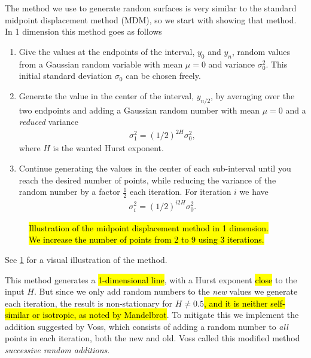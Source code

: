 The method we use to generate random surfaces is very similar to the standard midpoint displacement method (MDM), so we start with showing that method. In 1 dimension this method goes as follows
%
\begin{enumerate}
    \item Give the values at the endpoints of the interval, $y_0$ and $y_n$, random values from a Gaussian random variable with mean $\mu = 0$ and variance $\sigma_0^2$. This initial standard deviation $\sigma_0$ can be chosen freely.
    \item Generate the value in the center of the interval, $y_{n/2}$, by averaging over the two endpoints and adding a Gaussian random number with mean $\mu = 0$ and a \emph{reduced} variance
    \begin{align}
         \sigma_1^2 = \left(1/2\right)^{2H}\sigma_0^2, \label{eq:midpoint_sigma_first}
    \end{align}
    where $H$ is the wanted Hurst exponent.
    \item Continue generating the values in the center of each sub-interval until you reach the desired number of points, while reducing the variance of the random number by a factor $\frac{1}{2}$ each iteration. For iteration $i$ we have
    \begin{align}
        \sigma_i^2 = \left(1/2\right)^{i2H}\sigma_0^2. \label{eq:midpoint_sigma_general}
    \end{align}
\end{enumerate}
%
\begin{figure}[htpb]%
    \centering%
    \caption{%
        \hl{Illustration of the midpoint displacement method in 1 dimension. We increase the number of points from 2 to 9 using 3 iterations.}%
        \label{fig:midpoint01}%
    }%
\end{figure}%
See \cref{fig:midpoint01} for a visual illustration of the method.

This method generates a \hl{1-dimensional line}, with a Hurst exponent \hl{close} to the input $H$. But since we only add random numbers to the \emph{new} values we generate each iteration, the result is non-stationary for $H \neq 0.5$\cite{voss1985random}\hl{, and it is neither self-similar or isotropic, as noted by Mandelbrot}\cite{mandelbrot1982comment}. To mitigate this we implement the addition suggested by Voss\cite{voss1985random}, which consists of adding a random number to \emph{all} points in each iteration, both the new and old. Voss called this modified method \emph{successive random additions}. 

